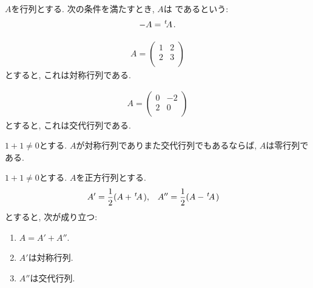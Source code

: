 \begin{definition}
  \label{def:altmat}
  $A$を行列とする.
  次の条件を満たすとき,
  $A$は
  であるという:
  \begin{align*}
    -A={\left.^{t}\!A\right.}.
  \end{align*}
\end{definition}

\begin{example}
  \begin{align*}
    A=
    \begin{pmatrix}
      1&2\\
      2&3\\
    \end{pmatrix}
  \end{align*}
  とすると, これは対称行列である.
\end{example}

\begin{example}
  \begin{align*}
    A=
    \begin{pmatrix}
      0&-2\\
      2&0\\
    \end{pmatrix}
  \end{align*}
  とすると, これは交代行列である.
\end{example}

\begin{prop}
  $1+1\neq 0$とする.
  $A$が対称行列でありまた交代行列でもあるならば,
  $A$は零行列である.
\end{prop}
\begin{prop}
  $1+1\neq 0$とする.
  $A$を正方行列とする.
  \begin{align*}
    A'&=\frac{1}{2}(A+{\left.^{t}\!A\right.}),&
    A''&=\frac{1}{2}(A-{\left.^{t}\!A\right.})
  \end{align*}
  とすると, 次が成り立つ:
  \begin{enumerate}
  \item $A=A'+A''$.
  \item $A'$は対称行列.
  \item $A''$は交代行列.
  \end{enumerate}
\end{prop}

